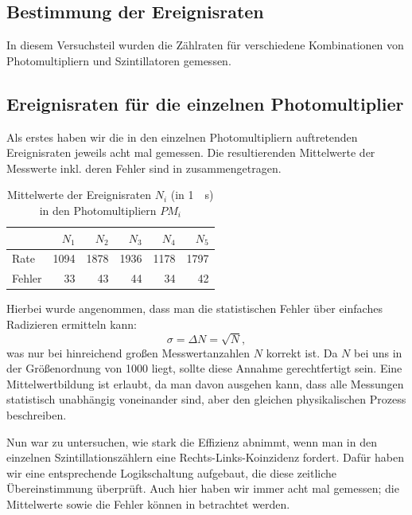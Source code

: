 \subsection{Bestimmung der Ereignisraten}

In diesem Versuchsteil wurden die Zählraten für verschiedene Kombinationen von
Photomultipliern und Szintillatoren gemessen.

\subsection{Ereignisraten für die einzelnen Photomultiplier}

Als erstes haben wir die in den einzelnen Photomultipliern auftretenden
Ereignisraten jeweils acht mal gemessen. Die resultierenden Mittelwerte der
Messwerte inkl. deren Fehler sind in  zusammengetragen.

\begin{table}[htbp]
\centering
\begin{tabular*}{\columnwidth}{l|rrrrr}%
\toprule
& {$N_1$} & {$N_2$} & {$N_3$} & {$N_4$} & {$N_5$}\\
\midrule
Rate & 1094 & 1878 & 1936 & 1178 & 1797\\
Fehler & 33 & 43 & 44 & 34 & 42\\
\bottomrule
\end{tabular*}
\caption{Mittelwerte der Ereignisraten $N_i$ (in \SI{1}{\per\second}) in den
Photomultipliern $PM_i$}
\label{tab:pm_messwerte}
\end{table}
Hierbei wurde angenommen, dass man die statistischen Fehler über einfaches
Radizieren ermitteln kann:
\begin{equation}
σ = \Delta N = \sqrt{N},
\end{equation}
was nur bei hinreichend großen Messwertanzahlen $N$ korrekt ist. Da $N$ bei uns
in der Größenordnung von 1000 liegt, sollte diese Annahme gerechtfertigt sein.
Eine Mittelwertbildung ist erlaubt, da man davon ausgehen kann, dass alle
Messungen statistisch unabhängig voneinander sind, aber den gleichen
physikalischen Prozess beschreiben.

Nun war zu untersuchen, wie stark die Effizienz abnimmt, wenn man in den
einzelnen Szintillationszählern eine Rechts-Links-Koinzidenz fordert. Dafür
haben wir eine entsprechende Logikschaltung aufgebaut, die diese zeitliche
Übereinstimmung überprüft. Auch hier haben wir immer acht mal gemessen; die
Mittelwerte sowie die Fehler können in  betrachtet
werden.

